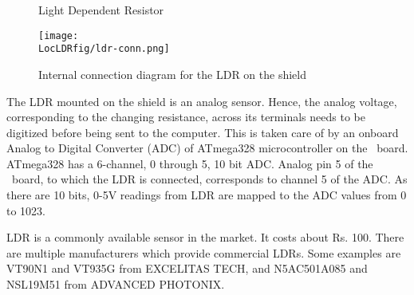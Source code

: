 \begin{figure}
\centering
{} \hfill
{}
\caption{Light Dependent Resistor}
\end{figure}

\begin{figure}
\centering
\texttt{[image: \\LocLDRfig/ldr-conn.png]}
\caption{Internal connection diagram for the LDR on the shield}
\label{fig:ldrconn}
\end{figure}

The LDR mounted on the shield is an analog sensor. Hence, the analog voltage, corresponding to the changing resistance, across its terminals needs to be digitized before being sent to the computer. This is taken care of by an onboard Analog to Digital Converter (ADC) of ATmega328 microcontroller on the \arduino\
board. ATmega328 has a 6-channel, 0 through 5, 10 bit ADC. Analog pin 5 of the \arduino\ board, to which the LDR is connected, corresponds to channel 5 of the ADC.  As there are 10 bits, 0-5V readings from LDR are mapped to the ADC values from 0 to 1023.

LDR is a commonly available sensor in the market. It costs about Rs. 100. There are multiple manufacturers which provide commercial LDRs.  Some examples are VT90N1 and VT935G from EXCELITAS TECH, and N5AC501A085 and NSL19M51 from ADVANCED PHOTONIX.


